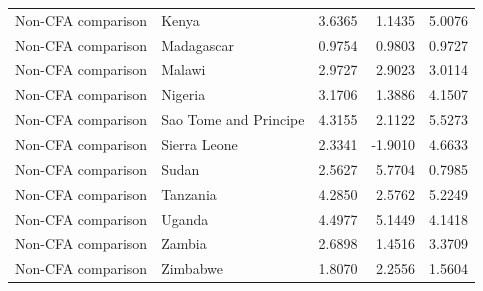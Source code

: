 \begin{table}
\begin{tabular}[t]{llrrr}
Non-CFA comparison & Kenya & 3.6365 & 1.1435 & 5.0076\\
\addlinespace
Non-CFA comparison & Madagascar & 0.9754 & 0.9803 & 0.9727\\
Non-CFA comparison & Malawi & 2.9727 & 2.9023 & 3.0114\\
Non-CFA comparison & Nigeria & 3.1706 & 1.3886 & 4.1507\\
Non-CFA comparison & Sao Tome and Principe & 4.3155 & 2.1122 & 5.5273\\
Non-CFA comparison & Sierra Leone & 2.3341 & -1.9010 & 4.6633\\
\addlinespace
Non-CFA comparison & Sudan & 2.5627 & 5.7704 & 0.7985\\
Non-CFA comparison & Tanzania & 4.2850 & 2.5762 & 5.2249\\
Non-CFA comparison & Uganda & 4.4977 & 5.1449 & 4.1418\\
Non-CFA comparison & Zambia & 2.6898 & 1.4516 & 3.3709\\
Non-CFA comparison & Zimbabwe & 1.8070 & 2.2556 & 1.5604\\
\bottomrule
\end{tabular}
\end{table}